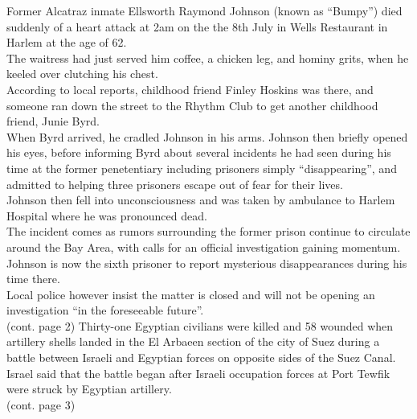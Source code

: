 \documentclass{article}
\date{July 9 1968}
\begin{document}
\addtolength{\topmargin}{+.4in}
\huge
\maketitle
\normalsize
\begin{multicols}{2}
\huge
{}
\normalsize
Former Alcatraz inmate Ellsworth Raymond Johnson (known as ``Bumpy'') died suddenly of a heart attack at 2am on the the 8th July in Wells Restaurant in Harlem at the age of 62.\\
\indent
The waitress had just served him coffee, a chicken leg, and hominy grits, when he keeled over clutching his chest.\\
\indent
According to local reports, childhood friend Finley Hoskins was there, and someone ran down the street to the Rhythm Club to get another childhood friend, Junie Byrd.\\
\indent
When Byrd arrived, he cradled Johnson in his arms.  Johnson then briefly opened his eyes, before informing Byrd about several incidents he had seen during his time at the former penetentiary including prisoners simply ``disappearing'', and admitted to helping three prisoners escape out of fear for their lives.\\
\indent
Johnson then fell into unconsciousness and was taken by ambulance to Harlem Hospital where he was pronounced dead.\\
\indent
The incident comes as rumors surrounding the former prison continue to circulate around the Bay Area, with calls for an official investigation gaining momentum.  Johnson is now the sixth prisoner to report mysterious disappearances during his time there.\\
\indent
Local police however insist the matter is closed and will not be opening an investigation ``in the foreseeable future''.\\
\indent
(cont. page 2)
\closearticle
\color{gray}
\huge
{}
\normalsize
Thirty-one Egyptian civilians were killed and 58 wounded when artillery shells landed in the El Arbaeen section of the city of Suez during a battle between Israeli and Egyptian forces on opposite sides of the Suez Canal.  Israel said that the battle began after Israeli occupation forces at Port Tewfik were struck by Egyptian artillery.\\
\indent
(cont. page 3)
\closearticle
\huge
{}

\end{multicols}
\end{document}
